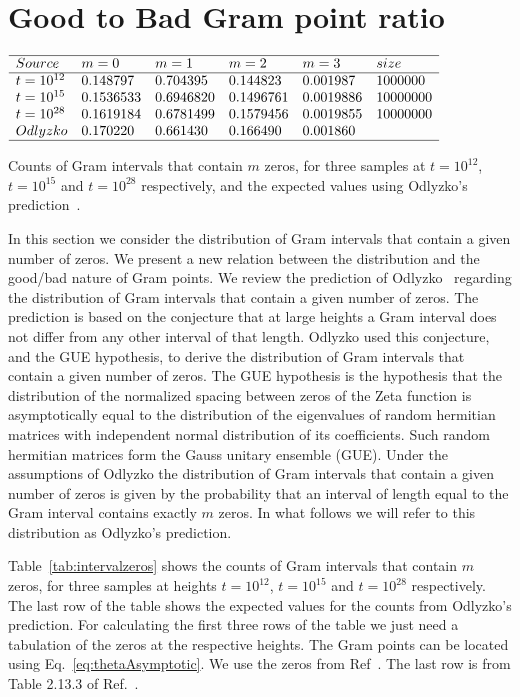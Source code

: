 \documentclass[twoside]{article}
\theoremstyle{definition}
\begin{document}
\section{\label{sec5}Good to Bad Gram point ratio}

\begin{table}
\centering \(\begin{array}{llllll}
\hline
Source &m = 0&m = 1&m = 2&m = 3&size\\
\hline
t = 10^{12}&0.148797&0.704395&0.144823&0.001987&1000000\\
t = 10^{15}&0.1536533&0.6946820&0.1496761&0.0019886&10000000\\
t = 10^{28}&0.1619184&0.6781499&0.1579456&0.0019855&10000000\\
Odlyzko&0.170220&0.661430&0.166490&0.001860&\\
\hline
\end{array}\)
\caption{Counts of Gram intervals that contain $m$ zeros, for three samples at $t=10^{12}$, $t=10^{15}$  and $t=10^{28}$ respectively, and the  expected values using Odlyzko's prediction~\cite{Odlyzko 1992}.} \label{tab:intervalzeros}
\end{table}


In this section we consider the distribution of Gram intervals that contain a given number of zeros. We present a new relation between the distribution and the good/bad nature of Gram points. 
We  review the prediction of Odlyzko~\cite{Odlyzko 1992} regarding the distribution of Gram intervals that contain a given number of zeros. The prediction is based on the conjecture that at large heights a Gram interval does not differ from any other interval of that length. Odlyzko used this conjecture, and the GUE hypothesis, to derive the distribution of Gram intervals that contain a given number of zeros.  
The GUE hypothesis  is the hypothesis that the distribution of the normalized spacing between zeros of the Zeta function is asymptotically equal to the distribution of the eigenvalues of random hermitian matrices with independent normal distribution of its coefficients. Such random hermitian matrices form the Gauss unitary ensemble (GUE). Under the assumptions of Odlyzko the distribution of Gram intervals that contain a given number of zeros is given by the probability that an interval of length equal to the Gram interval contains exactly $m$ zeros. In what follows we will refer to this distribution as Odlyzko's prediction.

Table~\ref{tab:intervalzeros} shows the counts of Gram intervals that contain $m$ zeros, for three samples at heights $t=10^{12}$, $t=10^{15}$  and $t=10^{28}$ respectively. The last row of the table shows the  expected values for the counts from Odlyzko's prediction. For calculating the first three rows of the table we just need a tabulation of the zeros at the respective heights. The Gram points can be located using Eq.~\ref{eq:thetaAsymptotic}. We use the zeros from Ref~\cite{hiary 2010}. The last row is from Table 2.13.3 of Ref.~\cite{Odlyzko 1992}.
\end{document}
